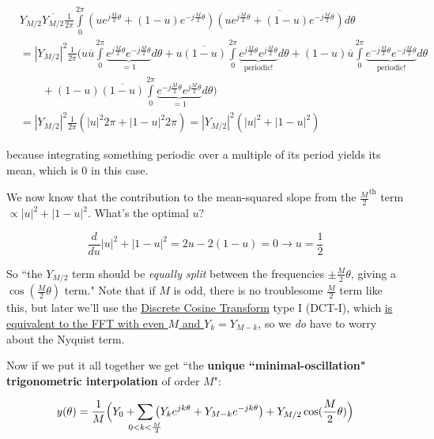 \documentclass[10pt]{article}
\begin{document}
\begin{align*}
& Y_{M/2}\overline{Y_{M/2}}\frac{1}{2\pi} \int\limits_{0}^{2\pi} (ue^{j\frac{M}{2}\theta} + (1 - u)e^{-j\frac{M}{2}\theta}) \overline{(ue^{j\frac{M}{2}\theta} + (1 - u)e^{-j\frac{M}{2}\theta})} d\theta \\
&= |Y_{M/2}|^2 \frac{1}{2\pi} \Big(u\overline{u} \int\limits_{0}^{2\pi} \underbrace{e^{j\frac{M}{2}\theta} e^{-j\frac{M}{2}\theta}}_{= 1} d\theta + u \overline{(1 - u)} \int\limits_{0}^{2\pi} \underbrace{e^{j\frac{M}{2}\theta} e^{j\frac{M}{2}\theta}}_{\text{periodic!}} d\theta + (1 - u)\overline{u} \int\limits_{0}^{2\pi} \underbrace{e^{-j\frac{M}{2}\theta} e^{-j\frac{M}{2}\theta}}_{\text{periodic!}} d\theta \\
& \quad \quad + (1 - u) \overline{(1 - u)} \int\limits_{0}^{2\pi} \underbrace{e^{-j\frac{M}{2}\theta} e^{j\frac{M}{2}\theta}}_{= 1} d\theta \Big) \\
&= |Y_{M/2}|^2 \frac{1}{2\pi} (|u|^2 2\pi + |1 - u|^2 2\pi) = |Y_{M/2}|^2 (|u|^2 + |1 - u|^2)
\end{align*}

\noindent because integrating something periodic over a multiple of its period yields its mean, which is 0 in this case.

We now know that the contribution to the mean-squared slope from the $\frac{M}{2}^\text{th}$ term $\propto |u|^2 + |1 - u|^2$. What's the optimal $u$?\vspace{-2mm}

$$\frac{d}{du} |u|^2 + |1 - u|^2 = 2u - 2(1-u) = 0 \longrightarrow u = \frac{1}{2}$$

So ``the $Y_{M/2}$ term should be \textit{equally split} between the frequencies $\pm\frac{M}{2}\theta$, giving a $\cos(\frac{M}{2}\theta)$ term." Note that if $M$ is odd, there is no troublesome $\frac{M}{2}$ term like this, but later we'll use the \href{https://docs.scipy.org/doc/scipy/reference/generated/scipy.fft.dct.html}{Discrete Cosine Transform}\cite{dct} type I (DCT-I), which \hyperref[fftdct]{is equivalent to the FFT with even $M$ and $Y_k = Y_{M-k}$}, so we \textit{do} have to worry about the Nyquist term.

Now if we put it all together we get ``the \textbf{unique ``minimal-oscillation" trigonometric interpolation} of order $M$":

\begin{equation}\label{interpolant}
y(\theta) = \frac{1}{M} \Big(Y_0 + \sum_{\mathclap{0 < k < \frac{M}{2}}} \big(Y_k e^{j k \theta} + Y_{M-k} e^{-j k \theta}\big) + Y_{M/2}\cos(\frac{M}{2}\theta) \Big)
\end{equation}
\end{document}
